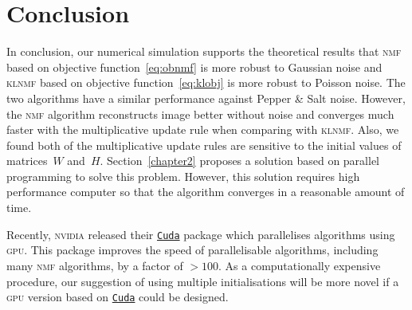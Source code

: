 \section{Conclusion}
In conclusion, our numerical simulation supports the theoretical results that \textsc{nmf} based on objective function~\eqref{eq:obnmf} is more robust to Gaussian noise and \textsc{klnmf} based on objective function~\eqref{eq:klobj} is more robust to Poisson noise. The two algorithms have a similar performance against Pepper \& Salt noise. However, the \textsc{nmf} algorithm reconstructs image better without noise and converges much faster with the multiplicative update rule when comparing with \textsc{klnmf}. Also, we found both of the multiplicative update rules are sensitive to the initial values of matrices~$W$ and~$H$. Section~\ref{chapter2} proposes a solution based on parallel programming to solve this problem. However, this solution requires high performance computer so that the algorithm converges in a reasonable amount of time.

Recently, \textsc{nvidia} released their \href{https://developer.nvidia.com/cuda-zone}{\texttt{Cuda}} package which parallelises algorithms using \textsc{gpu}. This package improves the speed of parallelisable algorithms, including many \textsc{nmf} algorithms, by a factor of $>100$. As a computationally expensive procedure, our suggestion of using multiple initialisations will be more novel if a \textsc{gpu} version based on \href{https://developer.nvidia.com/cuda-zone}{\texttt{Cuda}} could be designed. 